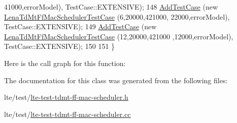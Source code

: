 \begin{DoxyCode}
      41000,errorModel), TestCase::EXTENSIVE);
148   \hyperlink{classns3_1_1TestCase_a3718088e3eefd5d6454569d2e0ddd835}{AddTestCase} (\textcolor{keyword}{new} \hyperlink{classLenaTdMtFfMacSchedulerTestCase}{LenaTdMtFfMacSchedulerTestCase} (6,20000,421000,
      22000,errorModel), TestCase::EXTENSIVE);
149   \hyperlink{classns3_1_1TestCase_a3718088e3eefd5d6454569d2e0ddd835}{AddTestCase} (\textcolor{keyword}{new} \hyperlink{classLenaTdMtFfMacSchedulerTestCase}{LenaTdMtFfMacSchedulerTestCase} (12,20000,421000
      ,12000,errorModel), TestCase::EXTENSIVE);
150 
151 \}
\end{DoxyCode}


Here is the call graph for this function\+:




The documentation for this class was generated from the following files\+:\begin{DoxyCompactItemize}
\item 
lte/test/\hyperlink{lte-test-tdmt-ff-mac-scheduler_8h}{lte-\/test-\/tdmt-\/ff-\/mac-\/scheduler.\+h}\item 
lte/test/\hyperlink{lte-test-tdmt-ff-mac-scheduler_8cc}{lte-\/test-\/tdmt-\/ff-\/mac-\/scheduler.\+cc}\end{DoxyCompactItemize}
